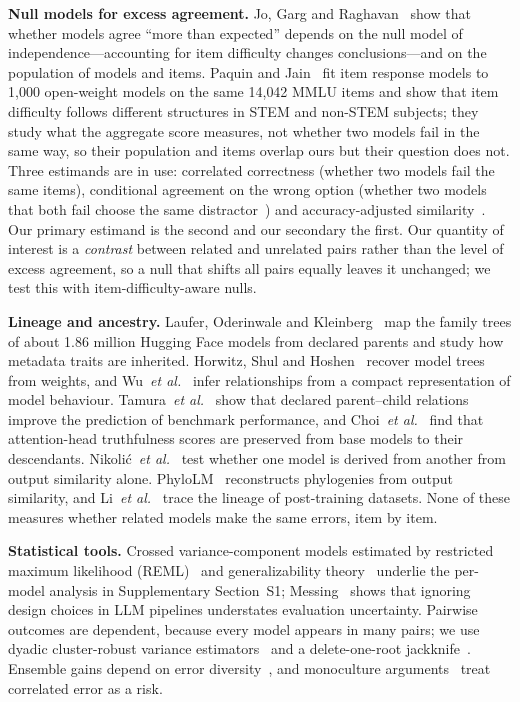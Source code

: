 \documentclass{ieeeaccess}
\theoremstyle{definition}
\theoremstyle{plain}
\begin{document}
\textbf{Null models for excess agreement.} Jo, Garg and Raghavan~\cite{jo2026} show that whether models agree ``more than expected'' depends on the null model of independence---accounting for item difficulty changes conclusions---and on the population of models and items. Paquin and Jain~\cite{paquin2026} fit item response models to 1{,}000 open-weight models on the same 14{,}042 MMLU items and show that item difficulty follows different structures in STEM and non-STEM subjects; they study what the aggregate score measures, not whether two models fail in the same way, so their population and items overlap ours but their question does not. Three estimands are in use: correlated correctness (whether two models fail the same items), conditional agreement on the wrong option (whether two models that both fail choose the same distractor~\cite{kim2025}) and accuracy-adjusted similarity~\cite{goel2025}. Our primary estimand is the second and our secondary the first. Our quantity of interest is a \emph{contrast} between related and unrelated pairs rather than the level of excess agreement, so a null that shifts all pairs equally leaves it unchanged; we test this with item-difficulty-aware nulls.

\textbf{Lineage and ancestry.} Laufer, Oderinwale and Kleinberg~\cite{laufer2025} map the family trees of about 1.86 million Hugging Face models from declared parents and study how metadata traits are inherited. Horwitz, Shul and Hoshen~\cite{horwitz2025} recover model trees from weights, and Wu~\textit{et al.}~\cite{wu2026dna} infer relationships from a compact representation of model behaviour. Tamura~\textit{et al.}~\cite{tamura2025} show that declared parent--child relations improve the prediction of benchmark performance, and Choi~\textit{et al.}~\cite{choi2026} find that attention-head truthfulness scores are preserved from base models to their descendants. Nikoli\'c~\textit{et al.}~\cite{nikolic2025} test whether one model is derived from another from output similarity alone. PhyloLM~\cite{phylolm2024} reconstructs phylogenies from output similarity, and Li~\textit{et al.}~\cite{li2026roots} trace the lineage of post-training datasets. None of these measures whether related models make the same errors, item by item.

\textbf{Statistical tools.} Crossed variance-component models estimated by restricted maximum likelihood (REML)~\cite{patterson1971,harville1977,searle1992} and generalizability theory~\cite{brennan2001} underlie the per-model analysis in Supplementary Section~S1; Messing~\cite{messing2026} shows that ignoring design choices in LLM pipelines understates evaluation uncertainty. Pairwise outcomes are dependent, because every model appears in many pairs; we use dyadic cluster-robust variance estimators~\cite{fafchamps2007,cameron2011,aronow2015} and a delete-one-root jackknife~\cite{efron1982}. Ensemble gains depend on error diversity~\cite{breiman2001}, and monoculture arguments~\cite{kleinberg2021,bommasani2022} treat correlated error as a risk.
\end{document}
